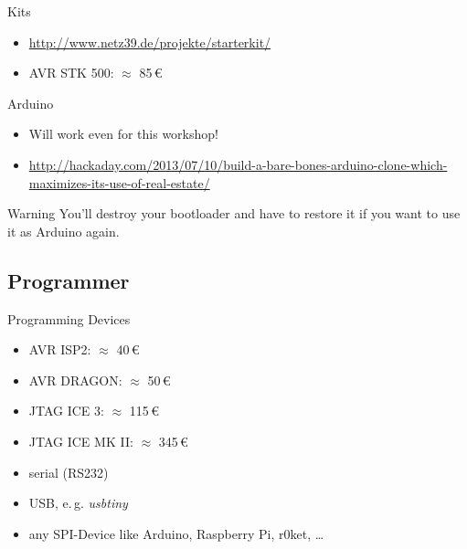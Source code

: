 \documentclass{beamer}
\begin{document}
\begin{frame}{Kits}
    \begin{figure}
    \end{figure}
    \begin{itemize}
        \item \url{http://www.netz39.de/projekte/starterkit/}
        \pause
        \item AVR STK 500: $\approx$ 85\,€
    \end{itemize}
\end{frame}


\begin{frame}{Arduino}
    \begin{itemize}
        \item Will work even for this workshop!
        \item \url{http://hackaday.com/2013/07/10/build-a-bare-bones-arduino-clone-which-maximizes-its-use-of-real-estate/}
    \end{itemize}
    \pause
    \begin{alertblock}{Warning}
        You'll destroy your bootloader and have to restore it if you
        want to use it as Arduino again.
    \end{alertblock}
\end{frame}

\subsection{Programmer}

\begin{frame}{Programming Devices}
    \begin{itemize}
        \item{AVR ISP2: $\approx$ 40\,€}
        \item{AVR DRAGON: $\approx$ 50\,€}
        \item{JTAG ICE 3: $\approx$ 115\,€}
        \item{JTAG ICE MK II: $\approx$ 345\,€}
        \pause
        \item{serial (RS232)}
        \item{USB, e.\,g. \emph{usbtiny}}
        \item{any SPI-Device like Arduino, Raspberry Pi, r0ket, …}
    \end{itemize}
\end{frame}
\end{document}
